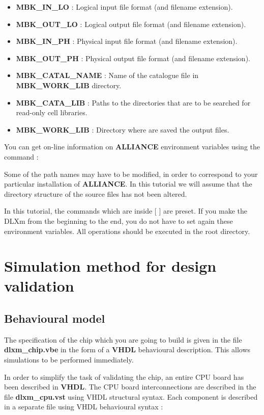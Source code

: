 \begin{itemize}
\item {\bf MBK\_IN\_LO}      : Logical input file format (and filename extension).
\item {\bf MBK\_OUT\_LO}     : Logical output file format (and filename extension).
\item {\bf MBK\_IN\_PH}      : Physical input file format (and filename extension).
\item {\bf MBK\_OUT\_PH}     : Physical output file format (and filename extension).
\item {\bf MBK\_CATAL\_NAME} : Name of the catalogue file in
{\bf MBK\_WORK\_LIB} directory.
\item {\bf MBK\_CATA\_LIB}   : Paths to the directories that are to be searched for read-only cell libraries.
\item {\bf MBK\_WORK\_LIB}   : Directory where are saved the output files.
\end{itemize}

You can get on-line information on {\bf ALLIANCE } environment variables using the command :


Some of the path names may have to be modified, in order to correspond to your particular installation of {\bf ALLIANCE}. In this tutorial we will assume that the directory structure of the source files has not been altered.

In this tutorial, the commands which are inside [ ] are preset. If you make the DLXm from the beginning to the end, you do not have to set again these environment variables.
All operations should be executed in the root directory.




\section{Simulation method for design validation}

    \subsection{Behavioural model}

The specification of the chip which you are going to build is given in
the file {\bf dlxm\_chip.vbe} in the form of a {\bf VHDL} behavioural description. This allows simulations to be performed immediately.

In order to simplify the task of validating the chip, an entire CPU board has been described in {\bf VHDL}. The CPU board interconnections are described in the file {\bf dlxm\_cpu.vst} using VHDL structural syntax. Each component is described in a separate file using VHDL behavioural syntax :

